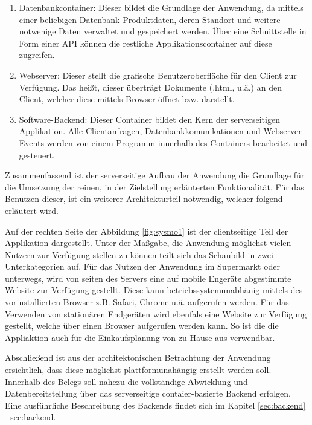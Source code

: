 \begin{enumerate}[leftmargin=*]
\item Datenbankcontainer: Dieser bildet die Grundlage der Anwendung, da mittels einer beliebigen Datenbank Produktdaten, deren Standort
      und weitere notwenige Daten verwaltet und gespeichert werden. Über eine Schnittstelle in Form einer \ac{API} können die restliche 
      Applikationscontainer auf diese zugreifen.

\item Webserver: Dieser stellt die grafische Benutzeroberfläche für den Client zur Verfügung. Das heißt, dieser überträgt Dokumente (.html, u.ä.)
      an den Client, welcher diese mittels Browser öffnet bzw. darstellt.

\item Software-Backend: Dieser Container bildet den Kern der serverseitigen Applikation. Alle Clientanfragen, Datenbankkomunikationen
      und Webserver Events werden von einem Programm innerhalb des Containers bearbeitet und gesteuert.      
\end{enumerate}

Zusammenfassend ist der serverseitige Aufbau der Anwendung die Grundlage für die Umsetzung der reinen, in der Zielstellung erläuterten 
Funktionalität. Für das Benutzen dieser, ist ein weiterer Architekturteil notwendig, welcher folgend erläutert wird.

Auf der rechten Seite der Abbildung \ref{fig:sysmo1} ist der clientseitige Teil der Applikation dargestellt. Unter der Maßgabe, 
die Anwendung möglichst vielen Nutzern zur Verfügung stellen zu können teilt sich das Schaubild in zwei Unterkategorien auf. 
Für das Nutzen der Anwendung im Supermarkt oder unterwegs, wird von seiten des Servers eine auf mobile Engeräte abgestimmte Website 
zur Verfügung gestellt. Diese kann betriebssystemunabhänig mittels des vorinstallierten Browser z.B. Safari, Chrome u.ä. aufgerufen werden.
Für das Verwenden von stationären Endgeräten wird ebenfals eine Website zur Verfügung gestellt, welche über einen Browser aufgerufen werden kann.
So ist die die Appliaktion auch für die Einkaufsplanung von zu Hause aus verwendbar. 



Abschließend ist aus der architektonischen Betrachtung der Anwendung ersichtlich, dass diese möglichst plattformunahängig erstellt werden soll.
Innerhalb des Belegs soll nahezu die vollständige Abwicklung und Datenbereitstellung über das serverseitige contaier-basierte Backend erfolgen.
Eine ausführliche Beschreibung des Backends findet sich im Kapitel \ref{sec:backend} - \refname{sec:backend}. 

